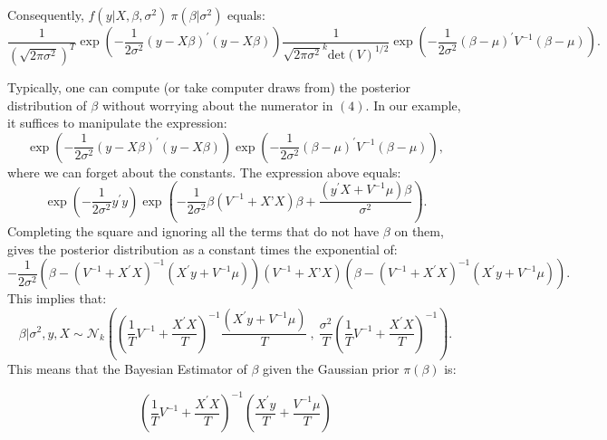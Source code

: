 \documentclass[12] {article}
\begin{document}
\noindent Consequently, $f(y | X, \beta, \sigma^2 )\:  \pi(\beta | \sigma^2 )$ equals:
\[ \frac{1}{(\sqrt{2 \pi \sigma^2} )^T} \exp \left( -\frac{1}{2\sigma^2} (y-X\beta)^{\prime} (y-X \beta) \right) \frac{1}{\sqrt{2 \pi \sigma^2}^{k} \textrm{det}(V)^{1/2}} \exp \left(-\frac{1}{2 \sigma^2} (\beta-\mu)^{\prime} V^{-1} (\beta-\mu) \right).  \]

Typically, one can compute (or take computer draws from) the posterior distribution of $\beta$ without worrying about the numerator in $(4)$. In our example, it suffices to manipulate the expression:
\[ \exp \left( -\frac{1}{2 \sigma^2} (y-X\beta)^{\prime} (y-X \beta) \right)  \exp \left(-\frac{1}{2 \sigma^2} (\beta-\mu)^{\prime} V^{-1} (\beta-\mu) \right),\]
where we can forget about the constants. The expression above equals:
\[ \exp \left( -\frac{1}{2\sigma^2} y^{\prime} y \right) \exp \left(  - \frac{1}{2 \sigma^2 } \beta \left(V^{-1} + X’X \right) \beta + \frac{(y^{\prime} X+V^{-1}\mu) \beta}{\sigma^2} \right). \]
Completing the square and ignoring all the terms that do not have $\beta$ on them, gives the posterior distribution as a constant times the exponential of:
\begin{equation*}
-\frac{1}{2 \sigma^2} \left( \beta -  \left( V^{-1} + X^{\prime} X \right)^{-1} (X^{\prime} y+ V^{-1} \mu) \right) \left(V^{-1} + X’X \right) \left( \beta -  \left( V^{-1} + X^{\prime} X \right)^{-1} (X^{\prime} y+ V^{-1}\mu) \right). 
\end{equation*}
This implies that:
\begin{equation}
\beta | \sigma^2, y, X \sim \mathcal{N}_{k} \left(  \left( \frac{1}{T} V^{-1} + \frac{X^{\prime} X}{T} \right)^{-1} \frac{(X^{\prime} y+V^{-1}\mu)}{T} \: , \:   \frac{\sigma^2}{T}\left(\frac{1}{T}V^{-1} + \frac{X^{\prime} X}{T} \right)^{-1}   \right).
\end{equation}
This means that the Bayesian Estimator of $\beta$ given the Gaussian prior $\pi(\beta)$ is:

\[  \left( \frac{1}{T} V^{-1} + \frac{X^{\prime} X}{T} \right)^{-1} \left( \frac{X^{\prime} y}{T}+ \frac{V^{-1}\mu}{T} \right) \]
 
\noindent 

\newpage
\end{document}
